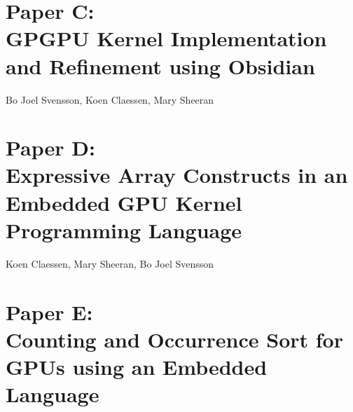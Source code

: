 \documentclass[a4paper]{book}
\newcommand{\paperC}{Paper C}
\newcommand{\paperCTitle}{GPGPU Kernel Implementation and Refinement using Obsidian}
\newcommand{\paperD}{Paper D}
\newcommand{\paperDTitle}{Expressive Array Constructs in an Embedded GPU Kernel Programming Language}
\newcommand{\paperE}{Paper E}
\newcommand{\paperETitle}{Counting and Occurrence Sort for GPUs using an Embedded Language}
\begin{document}


% 
\cleardoublepage 

\section[\paperCTitle]{\paperC: \\ \paperCTitle}
\label{sec:paperC}


\begin{center} 
Bo Joel Svensson, Koen Claessen, Mary Sheeran
\end{center}




% 
\cleardoublepage 

\section[\paperDTitle]{\paperD: \\ \paperDTitle}
\label{sec:paperD}


\begin{center} 
Koen Claessen, Mary Sheeran, Bo Joel Svensson
\end{center}



% 
\cleardoublepage 

\section[\paperETitle]{\paperE: \\ \paperETitle}
\label{sec:paperE}

\end{document}
